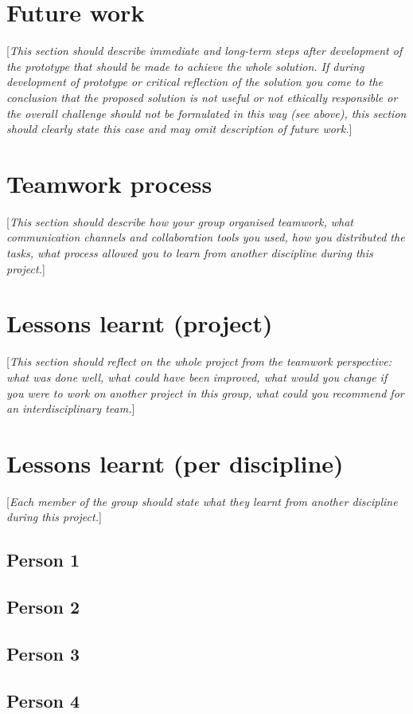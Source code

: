 \documentclass[10pt,english, openany]{book}
\begin{document}
\section{Future work}
[\textit{This section should describe immediate and long-term steps after development of the prototype that should be made to achieve the whole solution. If during development of prototype or critical reflection of the solution you come to the conclusion that the proposed solution is not useful or not ethically responsible or the overall challenge should not be formulated in this way (see above), this section should clearly state this case and may omit description of future work.}]

\section{Teamwork process}
[\textit{This section should describe how your group organised teamwork, what communication channels and collaboration tools you used, how you distributed the tasks, what process allowed you to learn from another discipline during this project.}]

\section{Lessons learnt (project)}
[\textit{This section should reflect on the whole project from the teamwork perspective: what was done well, what could have been improved, what would you change if you were to work on another project in this group, what could you recommend for an interdisciplinary team.}]

\section{Lessons learnt (per discipline)}
[\textit{Each member of the group should state what they learnt from another discipline during this project.}]
\subsection{Person 1}
\subsection{Person 2}
\subsection{Person 3}
\subsection{Person 4}
\end{document}
